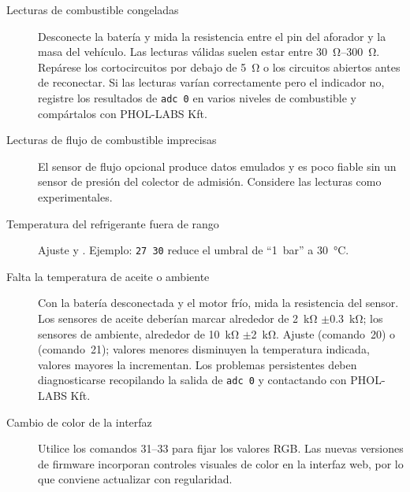 \begin{description}
    \item[Lecturas de combustible congeladas] Desconecte la batería y mida la resistencia entre el pin del aforador y la masa del vehículo. Las lecturas válidas suelen estar entre \SIrange{30}{300}{\ohm}. Repárese los cortocircuitos por debajo de \SI{5}{\ohm} o los circuitos abiertos antes de reconectar. Si las lecturas varían correctamente pero el indicador no, registre los resultados de \verb|adc 0| en varios niveles de combustible y compártalos con PHOL-LABS Kft.
    \item[Lecturas de flujo de combustible imprecisas] El sensor de flujo opcional produce datos emulados y es poco fiable sin un sensor de presión del colector de admisión. Considere las lecturas como experimentales.
    \item[Temperatura del refrigerante fuera de rango] Ajuste  y . Ejemplo: \verb|27 30| reduce el umbral de “1~bar” a \SI{30}{\celsius}.
    \item[Falta la temperatura de aceite o ambiente] Con la batería desconectada y el motor frío, mida la resistencia del sensor. Los sensores de aceite deberían marcar alrededor de \SI{2}{\kilo\ohm} \ensuremath{\pm}\SI{0.3}{\kilo\ohm}; los sensores de ambiente, alrededor de \SI{10}{\kilo\ohm} \ensuremath{\pm}\SI{2}{\kilo\ohm}. Ajuste  (comando~20) o  (comando~21); valores menores disminuyen la temperatura indicada, valores mayores la incrementan. Los problemas persistentes deben diagnosticarse recopilando la salida de \verb|adc 0| y contactando con PHOL-LABS Kft.
    \item[Cambio de color de la interfaz] Utilice los comandos 31--33 para fijar los valores RGB. Las nuevas versiones de firmware incorporan controles visuales de color en la interfaz web, por lo que conviene actualizar con regularidad.
\end{description}
